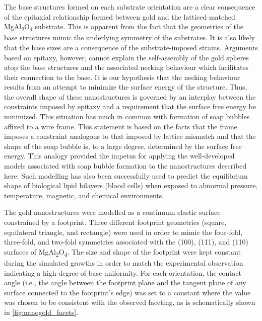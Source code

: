 The base structures formed on each substrate orientation are a clear consequence of the epitaxial relationship formed between gold and the latticed-matched MgAl\textsubscript{2}O\textsubscript{4} substrate.
This is apparent from the fact that the geometries of the base structures mimic the underlying symmetry of the substrates.
It is also likely that the base sizes are a consequence of the substrate-imposed strains.
Arguments based on epitaxy, however, cannot explain the self-assembly of the gold spheres atop the base structures and the associated necking behaviour which facilitates their connection to the base.
It is our hypothesis that the necking behaviour results from an attempt to minimize the surface energy of the structure.
Thus, the overall shape of these nanostructures is governed by an interplay between the constraints imposed by epitaxy and a requirement that the surface free energy be minimized.
This situation has much in common with formation of soap bubbles affixed to a wire frame\cite{RefWorks:95}.
This statement is based on the facts that the frame imposes a constraint analogous to that imposed by lattice mismatch and that the shape of the soap bubble is, to a large degree, determined by the surface free energy.
This analogy provided the impetus for applying the well-developed models associated with soap bubble formation to the nanostructures described here.
Such modelling has also been successfully used to predict the equilibrium shape of biological lipid bilayers (blood cells) when exposed to abnormal pressure, temperature, magnetic, and chemical environments\cite{RefWorks:99,RefWorks:102,RefWorks:47,RefWorks:100,RefWorks:101,RefWorks:103}.

The gold nanostructures were modelled as a continuum elastic surface constrained by a footprint.
Three different footprint geometries (square, equilateral triangle, and rectangle) were used in order to mimic the four-fold, three-fold, and two-fold symmetries associated with the (100), (111), and (110) surfaces of MgAl\textsubscript{2}O\textsubscript{4}.
The size and shape of the footprint were kept constant during the simulated growths in order to match the experimental observation indicating a high degree of base uniformity.
For each orientation, the contact angle (i.e., the angle between the footprint plane and the tangent plane of any surface connected to the footprint's edge) was set to a constant where the value was chosen to be consistent with the observed faceting, as is schematically shown in \cref{fig:nanogold_facets}.

